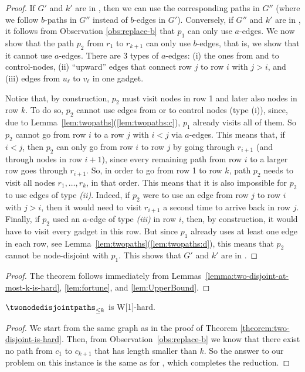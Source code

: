 \documentclass[a4paper,english]{lipics-v2016}
\theoremstyle{plain}
\begin{document}
\begin{proof}
  If $G'$ and $k'$ are in \knodecolordisjointpaths, then we can use the
  corresponding paths in $G''$ (where we follow $b$-paths in $G''$
  instead of $b$-edges in $G'$). Conversely, if $G''$ and $k'$ are in
  \knodedisjointpaths, it follows from Observation \ref{obs:replace-b}
  that $p_1$ can only use $a$-edges.       We now show that the path $p_2$ from $r_1$ to $r_{k+1}$ can only use
  $b$-edges, that is, we show that it cannot use $a$-edges. There are
  3 types of $a$-edges: (i) the ones from and to control-nodes,
  (ii) ``upward'' edges that connect row $j$ to row $i$ with
  $j>i$, and (iii) edges from $u_\ell$ to $v_\ell$ in one
  gadget.

  Notice that, by construction, $p_2$ must visit nodes in row 1 and
  later also nodes in row $k$. To do so, $p_2$ cannot use edges from
  or to control nodes (type (i)), since, due to
  Lemma~\ref{lem:twopaths}(\ref{lem:twopaths:c}), $p_1$ already visits
  all of them.  So $p_2$ cannot go from row $i$ to a row $j$ with
  $i<j$ via $a$-edges. This means that, if $i < j$, then $p_2$ can
  only go from row $i$ to row $j$ by going through $r_{i+1}$ (and
  through nodes in row $i+1$), since every remaining path from row $i$
  to a larger row goes through $r_{i+1}$. So, in order to go from row
  1 to row $k$, path $p_2$ needs to visit all nodes $r_1,\ldots,r_k$,
  in that order.  This means that it is also impossible for $p_2$ to
  use edges of type \emph{(ii)}. Indeed, if $p_2$ were to use an edge
  from row $j$ to row $i$ with $j > i$, then it would need to visit
  $r_{i+1}$ a second time to arrive back in row $j$.
                  Finally, if $p_2$ used an $a$-edge of type \emph{(iii)} in row
  $i$, then, by construction, it would have to visit every gadget in this
  row.  But
  since $p_1$ already uses at least one edge in each row, see Lemma~\ref{lem:twopaths}(\ref{lem:twopaths:d}), this means
  that $p_2$ cannot be node-disjoint with $p_1$.  This shows that $G'$
  and $k'$ are in \knodecolordisjointpaths.
  \end{proof}



\TheoPathsAllTheRest*
\begin{proof}
  The theorem follows immediately from
  Lemmas~\ref{lemma:two-disjoint-at-most-k-is-hard}, \ref{lem:fortune}, and \ref{lem:UpperBound}.
\end{proof}

\begin{lemma} \label{lemma:two-disjoint-at-most-k-is-hard}
  $\twonodedisjointpaths_{\leq k}$ is W[1]-hard.
\end{lemma}
\begin{proof}
    We start from the same graph as in the proof of Theorem \ref{theorem:two-disjoint-is-hard}. Then,
  from Observation~\ref{obs:replace-b} we know that there exist no
  path from $c_1$ to $c_{k+1}$ that has length smaller than $k$. So the answer to our problem on
  this instance is the same as for \knodedisjointpaths, which completes
  the reduction.
\end{proof}
\end{document}

